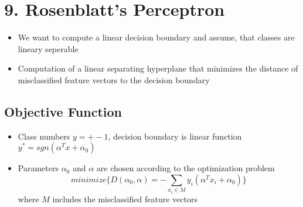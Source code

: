 \section*{9. Rosenblatt's Perceptron}
\begin{itemize}
    \item
        We want to compute a linear decision boundary and assume, that classes are lineary seperable
    \item
        Computation of a linear separating hyperplane that minimizes the distance of misclassified feature vectors to the decision boundary
\end{itemize}
\subsection*{Objective Function}
\begin{itemize}
    \item
        Class numbers $y = +- 1$, decision boundary is linear function $y^* = sgn(\alpha^T x + \alpha_0)$
    \item
        Parameters $\alpha_0$ and $\alpha$ are chosen according to the optimization problem
        $$ minimize \{ D(\alpha_0, \alpha) = - \sum_{x_i \in M} y_i (\alpha^T x_i + \alpha_0)\} $$
        where $M$ includes the misclassified feature vectors
\end{itemize}
